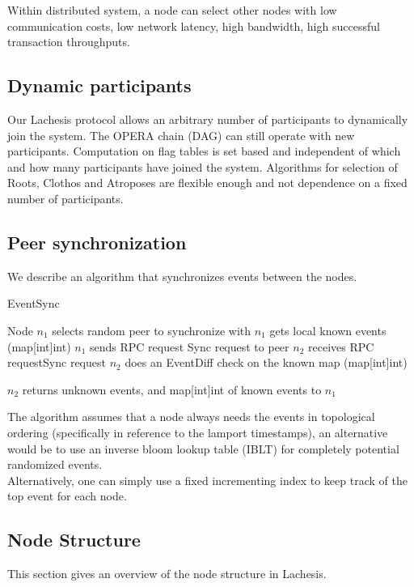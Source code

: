 \documentclass{article}
\begin{document}
Within distributed system, a node can select other nodes with low communication costs, low network latency, high bandwidth, high successful transaction throughputs.

\subsection{Dynamic participants}
Our Lachesis protocol allows an arbitrary number of participants to dynamically join the system. The OPERA chain (DAG) can still operate with new participants. Computation on flag tables is set based and independent of which and how many participants have joined the system. Algorithms for selection of Roots, Clothos and Atroposes are flexible enough and not dependence on a fixed number of participants.

\newpage
\subsection{Peer synchronization}

We describe an algorithm that synchronizes events between the nodes.

\begin{algorithm}[H]
	\caption{EventSync}\label{al:syncevents}
	\begin{algorithmic}[1]
		\State Node $n_1$ selects random peer to synchronize with
		\State $n_1$ gets local known events (map[int]int)
		\State $n_1$ sends RPC request Sync request to peer
		\State $n_2$ receives RPC requestSync request
		\State $n_2$ does an EventDiff check on the known map (map[int]int)
		
		\State $n_2$ returns unknown events, and map[int]int of known events to $n_1$		
		
		\EndProcedure
	\end{algorithmic}
\end{algorithm}

The algorithm assumes that a node always needs the events in topological ordering (specifically in reference to the lamport timestamps), an alternative would be to use an inverse bloom lookup table (IBLT) for completely potential randomized events. \\

Alternatively, one can simply use a fixed incrementing index to keep track of the top event for each node.\\

\subsection{Node Structure}
This section gives an overview of the node structure in Lachesis.
\end{document}
